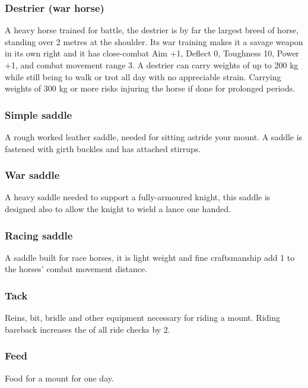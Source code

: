 \documentclass[a4paper,11pt,oneside]{book}
\newcommand{\textlf}[1]{\textbf{\titlecap{#1}}}
\begin{document}
\subsubsection*{Destrier (war horse)}
A heavy horse trained for battle, the destrier is by far the largest breed of horse, standing over 2 metres at the shoulder. Its war training makes it a savage weapon in its own right and it has close-combat Aim +1, Deflect 0, Toughness 10, Power +1, and combat movement range 3. A destrier can carry weights of up to 200 kg while still being to walk or trot all day with no appreciable strain. Carrying weights of 300 kg or more risks injuring the horse if done for prolonged periods.

\subsubsection*{Simple saddle}
A rough worked leather saddle, needed for sitting astride your mount. A saddle is fastened with girth buckles and has attached stirrups.

\subsubsection*{War saddle}
A heavy saddle needed to support a fully-armoured knight, this saddle is designed also to allow the knight to wield a lance one handed.

\subsubsection*{Racing saddle}
A saddle built for race horses, it is light weight and fine craftsmanship add 1 to the horses' combat movement distance.

\subsubsection*{Tack}
Reins, bit, bridle and other equipment necessary for riding a mount. Riding bareback increases the \textlf{difficulty} of all ride checks by 2.

\subsubsection*{Feed}
Food for a mount for one day.
\end{document}
